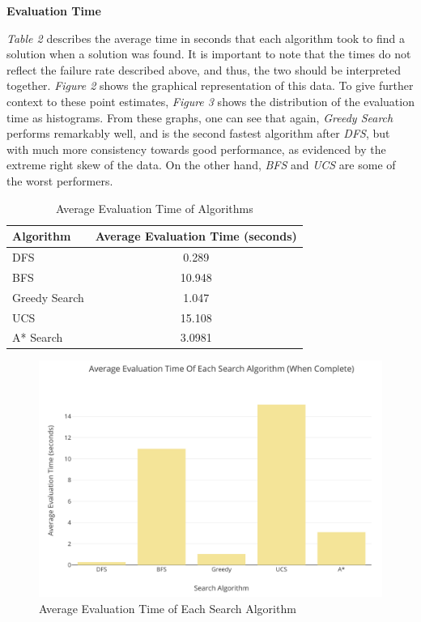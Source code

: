 \documentclass[11pt]{article}
\begin{document}
\textbf{Evaluation Time}

\textit{Table 2} describes the average time in seconds that each algorithm took to find a solution when a solution was found. It is important to note that the times do not reflect the failure rate described above, and thus, the two should be interpreted together. \textit{Figure 2} shows the graphical representation of this data. To give further context to these point estimates, \textit{Figure 3} shows the distribution of the evaluation time as histograms. From these graphs, one can see that again, \textit{Greedy Search} performs remarkably well, and is the second fastest algorithm after \textit{DFS}, but with much more consistency towards good performance, as evidenced by the extreme right skew of the data. On the other hand, \textit{BFS} and \textit{UCS} are some of the worst performers.

\begin{table}[!h]
  \centering
  \begin{tabular}{l c}
    \toprule
    Algorithm & Average Evaluation Time (seconds) \\
    \midrule
    DFS & 0.289 \\
    BFS & 10.948 \\
    Greedy Search & 1.047 \\
    UCS & 15.108 \\
    A* Search & 3.0981 \\
    \bottomrule
  \end{tabular}
  \caption{Average Evaluation Time of Algorithms}
\end{table}

\begin{figure}[!h]
\centering
\includegraphics[width=\textwidth]{time_bar.png}
\caption{Average Evaluation Time of Each Search Algorithm}
\end{figure}
\end{document}
